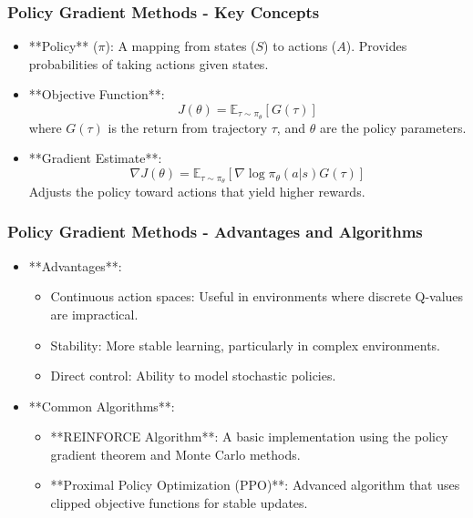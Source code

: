 \documentclass[aspectratio=169]{beamer}
\begin{document}
\begin{frame}[fragile]
    \frametitle{Policy Gradient Methods - Key Concepts}
    \begin{itemize}
        \item **Policy** ($\pi$): A mapping from states ($S$) to actions ($A$). Provides probabilities of taking actions given states.
        \item **Objective Function**:
          \begin{equation}
            J(\theta) = \mathbb{E}_{\tau \sim \pi_\theta} \left[ G(\tau) \right]
          \end{equation}
          where \(G(\tau)\) is the return from trajectory $\tau$, and $\theta$ are the policy parameters.
        \item **Gradient Estimate**:
          \begin{equation}
            \nabla J(\theta) = \mathbb{E}_{\tau \sim \pi_\theta} \left[ \nabla \log \pi_\theta(a|s) G(\tau) \right]
          \end{equation}
          Adjusts the policy toward actions that yield higher rewards.
    \end{itemize}
\end{frame}

\begin{frame}[fragile]
    \frametitle{Policy Gradient Methods - Advantages and Algorithms}
    \begin{itemize}
        \item **Advantages**:
            \begin{itemize}
                \item Continuous action spaces: Useful in environments where discrete Q-values are impractical.
                \item Stability: More stable learning, particularly in complex environments.
                \item Direct control: Ability to model stochastic policies.
            \end{itemize}
        \item **Common Algorithms**:
            \begin{itemize}
                \item **REINFORCE Algorithm**: A basic implementation using the policy gradient theorem and Monte Carlo methods.
                \item **Proximal Policy Optimization (PPO)**: Advanced algorithm that uses clipped objective functions for stable updates.
            \end{itemize}
    \end{itemize}
\end{frame}
\end{document}
